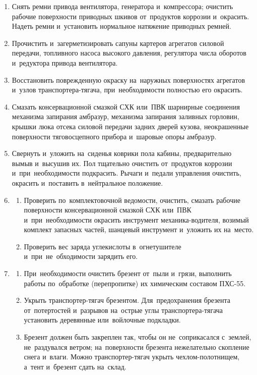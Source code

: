 \begin{enumerate}
    \item Снять ремни привода вентилятора, генератора и~компрессора; очистить рабочие поверхности приводных шкивов от~продуктов коррозии и~окрасить. 
    Надеть ремни и~установить нормальное натяжение приводных ремней. 

    \item Прочистить и~загерметизировать сапуны картеров агрегатов силовой передачи, топливного насоса высокого давления, регулятора числа оборотов и~редуктора привода вентилятора. 

    \item Восстановить поврежденную окраску на~наружных поверхностях агрегатов и~узлов транспортера-тягача, при~необходимости полностью его окрасить. 

    \item Смазать консервационной смазкой СХК или~ПВК шарнирные соединения механизма запирания амбразур, механизма запирания заливных горловин, крышки люка отсека силовой передачи задних дверей кузова, неокрашенные поверхности тяговосцепного прибора и~шаровые опоры амбразур. 

    \item Свернуть и~уложить на~сиденья коврики пола кабины, предварительно вымыв и~высушив их. Пол тщательно очистить от~продуктов коррозии и~при~необходимости подкрасить. 
    Рычаги и~педали управления очистить, окрасить и~поставить в~нейтральное положение. 

    \item \begin{enumerate}
        \item Проверить по~комплектовочной ведомости, очистить, смазать рабочие поверхности консервационной смазкой СХК или~ПВК и~при~необходимости окрасить инструмент механика-водителя, возимый комплект запасных частей, шанцевый инструмент и~уложить их на~место. 
        \item Проверить вес заряда углекислоты в~огнетушителе и~при~не~обходимости зарядить его. 
    \end{enumerate}

    \item \begin{enumerate}
        \item При~необходимости очистить брезент от~пыли и~грязи, выполнить работы по~обработке (перепропитке) их химическим составом ПХС-55. 
        \item Укрыть транспортер-тягач брезентом. Для~предохранения брезента от~потертостей и~разрывов на~острые углы транспортера-тягача установить деревянные или~войлочные подкладки. 
        \item Брезент должен быть закреплен так, чтобы он не~соприкасался с~землей, не~раздувался ветром; на~поверхности брезента нежелательно скопление снега и~влаги. Можно транспортер-тягач укрыть чехлом-полотнищем, а~тент и~брезент сдать на~склад. 
    \end{enumerate}


\end{enumerate}
